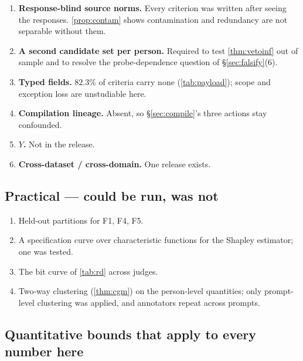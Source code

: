 \begin{enumerate}
\item \textbf{Response-blind source norms.} Every criterion was written after
      seeing the responses. \cref{prop:contam} shows contamination and redundancy
      are not separable without them.
\item \textbf{A second candidate set per person.} Required to test
      \cref{thm:vetoinf} out of sample and to resolve the probe-dependence
      question of §\ref{sec:falsify}(6).
\item \textbf{Typed fields.} $82.3\%$ of criteria carry none
      (\cref{tab:payload}); scope and exception loss are unstudiable here.
\item \textbf{Compilation lineage.} Absent, so §\ref{sec:compile}'s three actions
      stay confounded.
\item \textbf{$Y$.} Not in the release.
\item \textbf{Cross-dataset / cross-domain.} One release exists.
\end{enumerate}

\subsection{Practical --- could be run, was not}

\begin{enumerate}
\item Held-out partitions for F1, F4, F5.
\item A specification curve over characteristic functions for the Shapley
      estimator; one was tested.
\item The bit curve of \cref{tab:rd} across judges.
\item Two-way clustering (\cref{thm:cgm}) on the person-level quantities; only
      prompt-level clustering was applied, and annotators repeat across prompts.
\end{enumerate}

\subsection{Quantitative bounds that apply to every number here}

